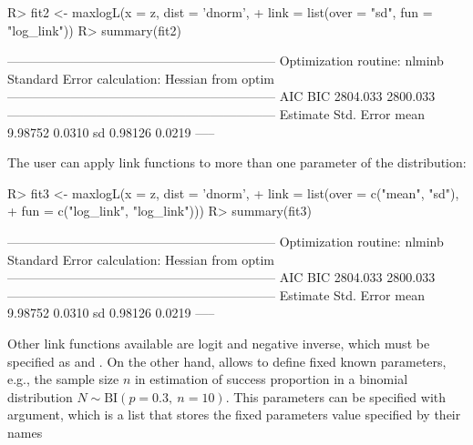 \documentclass[nojss]{jss}
\begin{document}
\begin{Schunk}
\begin{Sinput}
R> fit2 <- maxlogL(x = z, dist = 'dnorm',
+                  link = list(over = "sd", fun = "log_link"))
R> summary(fit2)
\end{Sinput}
\begin{Soutput}
---------------------------------------------------------------
Optimization routine: nlminb 
Standard Error calculation: Hessian from optim 
---------------------------------------------------------------
       AIC      BIC
  2804.033 2800.033
---------------------------------------------------------------
     Estimate  Std. Error
mean   9.98752     0.0310
sd     0.98126     0.0219
-----
\end{Soutput}
\end{Schunk}

The user can apply link functions to more than one parameter of the distribution:

\begin{Schunk}
\begin{Sinput}
R> fit3 <- maxlogL(x = z, dist = 'dnorm',
+                  link = list(over = c("mean", "sd"),
+                              fun = c("log_link", "log_link")))
R> summary(fit3)
\end{Sinput}
\begin{Soutput}
---------------------------------------------------------------
Optimization routine: nlminb 
Standard Error calculation: Hessian from optim 
---------------------------------------------------------------
       AIC      BIC
  2804.033 2800.033
---------------------------------------------------------------
     Estimate  Std. Error
mean   9.98752     0.0310
sd     0.98126     0.0219
-----
\end{Soutput}
\end{Schunk}

Other link functions available are logit and negative inverse, which must be specified as  and . On the other hand,  allows to define fixed known parameters, e.g., the sample size $n$ in estimation of success proportion in a binomial distribution $N \sim \text{BI}(p=0.3, \: n=10)$. This parameters can be specified with  argument, which is a list that stores the fixed parameters value specified by their names
\end{document}
